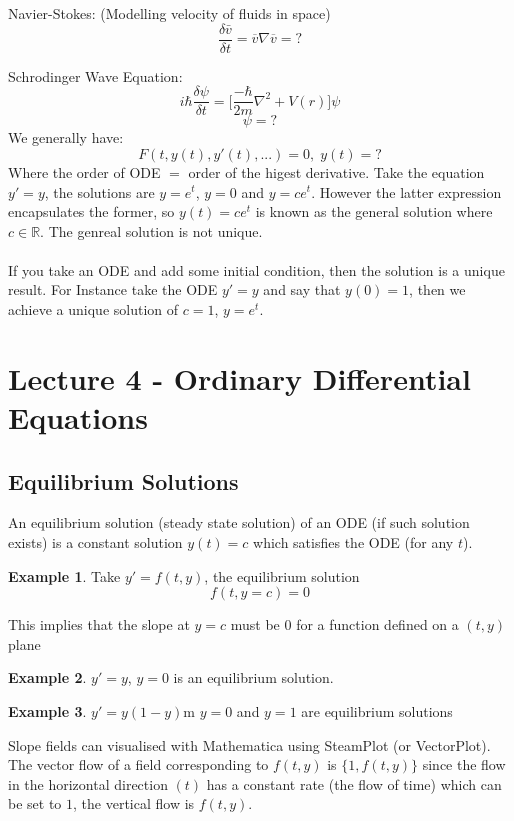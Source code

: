\documentclass[a6paper]{article}
\theoremstyle{definition}
\newtheorem{example}{Example}
\theoremstyle{plain}
\theoremstyle{remark}
\begin{document}
	Navier-Stokes: (Modelling velocity of fluids in space)
	$$ \frac{\delta \bar{v}}{\delta t} = \overline{v} \nabla \overline{v} = ? $$

	Schrodinger Wave Equation:
	$$ i\hbar \frac{\delta \psi}{\delta t} = \Big[ \frac{-\hbar}{2m} \nabla^2 + V(r)\Big]\psi$$
	$$ \psi = ? $$
	We generally have:
	$$ F(t, y(t), y'(t), ...) = 0,\; y(t) = ? $$
	Where the order of ODE $ = $ order of the higest derivative. Take the equation $y' = y$, the solutions are $ y = e^t $, $ y = 0 $ and $ y = ce^t $. However the latter expression encapsulates the former, so $ y(t) = ce^t $ is known as the general solution where $ c \in \mathbb{R} $. The genreal solution is not unique. \\\\
	If you take an ODE and add some initial condition, then the solution is a unique result. For Instance take the ODE $ y' = y $ and say that $ y(0) = 1 $, then we achieve a unique solution of $ c = 1 $, $ y = e^t $.
      \section{Lecture 4 - Ordinary Differential Equations}
      \subsection{Equilibrium Solutions}
      An equilibrium solution (steady state solution) of an ODE (if such
      solution exists) is a constant solution $ y(t) = c $ which satisfies the
      ODE (for any $ t $). 
      \begin{example}
	Take $ y' = f(t,y) $, the equilibrium solution 
	$$ f(t,y = c) = 0 $$
      \end{example}
      \noindent This implies that the slope at $ y = c $ must be 0 for
      a function defined on a $ (t,y) $ plane

      \begin{example}
      $ y' = y $, $ y = 0 $ is an equilibrium solution.
      \end{example}

      \begin{example}
	$ y' = y(1-y) $m $ y = 0 $ and $ y = 1 $ are equilibrium solutions
      \end{example}
      \noindent Slope fields can visualised with Mathematica using SteamPlot
      (or VectorPlot). The vector flow of a field corresponding to $ f(t,y)
      $ is $ \{1, f(t,y)\} $ since the flow in the horizontal direction $ (t)
      $ has a constant rate (the flow of time) which can be set to $ 1 $, the
      vertical flow is $ f(t,y) $.
\end{document}
